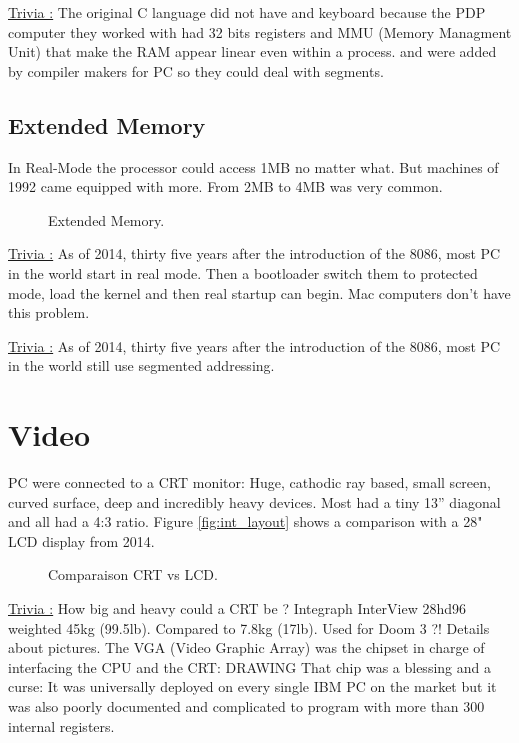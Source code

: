 \documentclass[book.tex]{subfiles}
\begin{document}
{\underline{Trivia :}} The original C language did not have  and  keyboard because the PDP computer they worked with had 32 bits registers and MMU (Memory Managment Unit) that make the RAM appear linear even within a process.  and  were added by compiler makers for PC so they could deal with segments.




  \subsection{Extended Memory}

In Real-Mode the processor could access 1MB no matter what. But machines of 1992 came equipped with more. From 2MB to 4MB was very common. 

  \begin{figure}[H]
\centering
 
 \caption{Extended Memory.}
 \end{figure}


{\underline{Trivia :}}  As of 2014, thirty five years after the introduction of the 8086, most PC in the world start in  real mode. Then a bootloader switch them to protected mode, load the kernel and then real startup can begin. Mac computers don't have this problem.

\bigskip

{\underline{Trivia :}}  As of 2014, thirty five years after the introduction of the 8086, most PC in the world still use segmented addressing.




\section{Video}

PC were connected to a CRT monitor: Huge, cathodic ray based, small screen, curved surface, deep and incredibly heavy devices. Most had a tiny 13” diagonal and all had a 4:3 ratio. Figure \ref{fig:int_layout} shows a comparison with a 28" LCD display from 2014.

  \begin{figure}[H]
\centering
 
 \caption{Comparaison CRT vs LCD.}\label{fig:lcd_vs_crt}
 \end{figure}

{\underline{Trivia :}} How big and heavy could a CRT be ? Integraph InterView 28hd96 weighted 45kg (99.5lb). Compared to 7.8kg (17lb). Used for Doom 3 ?! Details about pictures.
\bigskip
The VGA (Video Graphic Array) was the chipset in charge of interfacing the CPU and the CRT:
\bigskip
DRAWING
\bigskip
That chip was a blessing and a curse: It was universally deployed on every single IBM PC on the market but it was also poorly documented and complicated to program with more than 300 internal registers.
\end{document}
